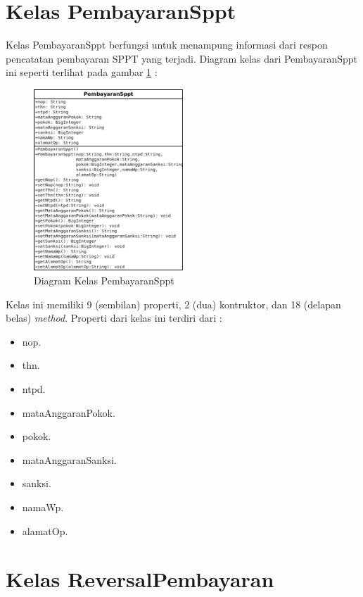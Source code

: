 \section{Kelas PembayaranSppt}

Kelas PembayaranSppt berfungsi untuk menampung informasi dari respon pencatatan pembayaran SPPT yang terjadi. Diagram kelas dari PembayaranSppt ini seperti terlihat pada gambar \ref{fig:uml-class-PembayaranSppt} :

\begin{figure}[H]
  \centering
  \includegraphics[width=0.5\textwidth]{./resources/uml/uml-class-PembayaranSppt}
  \caption{Diagram Kelas PembayaranSppt}
  \label{fig:uml-class-PembayaranSppt}
\end{figure}

Kelas ini memiliki 9 (sembilan) properti, 2 (dua) kontruktor, dan 18 (delapan belas) \textit{method}. Properti dari kelas ini terdiri dari :

\begin{itemize}
\item nop.
\item thn.
\item ntpd.
\item mataAnggaranPokok.
\item pokok.
\item mataAnggaranSanksi.
\item sanksi.
\item namaWp.
\item alamatOp.
\end{itemize}

\section{Kelas ReversalPembayaran}